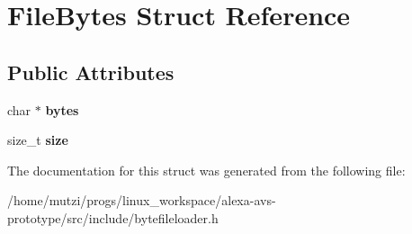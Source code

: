 \hypertarget{structFileBytes}{}\section{File\+Bytes Struct Reference}
\label{structFileBytes}
\subsection*{Public Attributes}
\begin{DoxyCompactItemize}
\item 
\mbox{\label{structFileBytes_a1a32b326061286eb4d7551efb950c2fb}} 
char $\ast$ {\bfseries bytes}
\item 
\mbox{\label{structFileBytes_a604b8d5fde88eb710f085717627a3953}} 
size\+\_\+t {\bfseries size}
\end{DoxyCompactItemize}


The documentation for this struct was generated from the following file\+:\begin{DoxyCompactItemize}
\item 
/home/mutzi/progs/linux\+\_\+workspace/alexa-\/avs-\/prototype/src/include/bytefileloader.\+h\end{DoxyCompactItemize}
